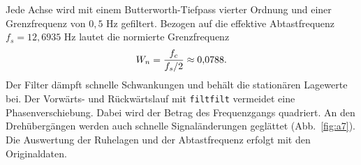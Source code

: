 \documentclass[a4paper,oneside,10pt]{article}
\begin{document}
Jede Achse wird mit einem Butterworth-Tiefpass vierter Ordnung und
einer Grenzfrequenz von $0{,}5$ Hz gefiltert. Bezogen auf die effektive
Abtastfrequenz $f_s=12{,}6935$ Hz lautet die normierte Grenzfrequenz
\begin{equation}
W_n = \frac{f_c}{f_s/2} \approx 0{,}0788.
\formeleintrag{Normierte Grenzfrequenz des Butterworth-Tiefpasses}
\end{equation}
Der Filter dämpft schnelle Schwankungen und behält die stationären Lagewerte
bei. Der Vorwärts- und Rückwärtslauf mit \texttt{filtfilt} vermeidet eine
Phasenverschiebung. Dabei wird der Betrag des Frequenzgangs quadriert.
An den Drehübergängen werden auch schnelle Signaländerungen geglättet
(Abb.~\ref{fig:a7}). Die Auswertung der Ruhelagen und der Abtastfrequenz
erfolgt mit den Originaldaten.
\clearpage
\end{document}
